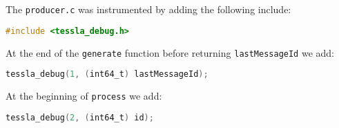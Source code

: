 \documentclass[language=en,sheet=7,prefix]{exercise}
\begin{document}
\begin{solution}
  

  The \texttt{producer.c} was instrumented by adding the following include:
  \begin{lstlisting}[language=C,gobble=4]
    #include <tessla_debug.h>
  \end{lstlisting}

  At the end of the \texttt{generate} function before returning \texttt{lastMessageId} we add:
  \begin{lstlisting}[language=C,gobble=4]
    tessla_debug(1, (int64_t) lastMessageId);
  \end{lstlisting}

  At the beginning of \texttt{process} we add:
  \begin{lstlisting}[language=C,gobble=4]
    tessla_debug(2, (int64_t) id);
  \end{lstlisting}
\end{solution}
\end{document}
